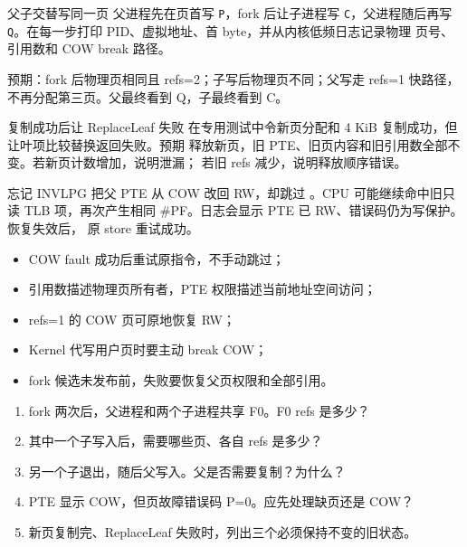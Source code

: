 \begin{experimentbox}{父子交替写同一页}
父进程先在页首写 \texttt{P}，fork 后让子进程写 \texttt{C}，父进程随后再写
\texttt{Q}。在每一步打印 PID、虚拟地址、首 byte，并从内核低频日志记录物理
页号、引用数和 COW break 路径。

预期：fork 后物理页相同且 refs=2；子写后物理页不同；父写走 refs=1 快路径，
不再分配第三页。父最终看到 Q，子最终看到 C。
\end{experimentbox}

\begin{faultinjectionbox}{复制成功后让 ReplaceLeaf 失败}
在专用测试中令新页分配和 4 KiB 复制成功，但让叶项比较替换返回失败。预期
释放新页，旧 PTE、旧页内容和旧引用数全部不变。若新页计数增加，说明泄漏；
若旧 refs 减少，说明释放顺序错误。
\end{faultinjectionbox}

\begin{faultinjectionbox}{忘记 INVLPG}
把父 PTE 从 COW 改回 RW，却跳过 。CPU 可能继续命中旧只读 TLB
项，再次产生相同 \#PF。日志会显示 PTE 已 RW、错误码仍为写保护。恢复失效后，
原 store 重试成功。
\end{faultinjectionbox}

\begin{pitfallbox}
\begin{itemize}[leftmargin=2.2em]
  \item COW fault 成功后重试原指令，不手动跳过；
  \item 引用数描述物理页所有者，PTE 权限描述当前地址空间访问；
  \item refs=1 的 COW 页可原地恢复 RW；
  \item Kernel 代写用户页时要主动 break COW；
  \item fork 候选未发布前，失败要恢复父页权限和全部引用。
\end{itemize}
\end{pitfallbox}


\begin{enumerate}[leftmargin=2.2em]
  \item fork 两次后，父进程和两个子进程共享 F0。F0 refs 是多少？
  \item 其中一个子写入后，需要哪些页、各自 refs 是多少？
  \item 另一个子退出，随后父写入。父是否需要复制？为什么？
  \item PTE 显示 COW，但页故障错误码 P=0。应先处理缺页还是 COW？
  \item 新页复制完、ReplaceLeaf 失败时，列出三个必须保持不变的旧状态。
\end{enumerate}

